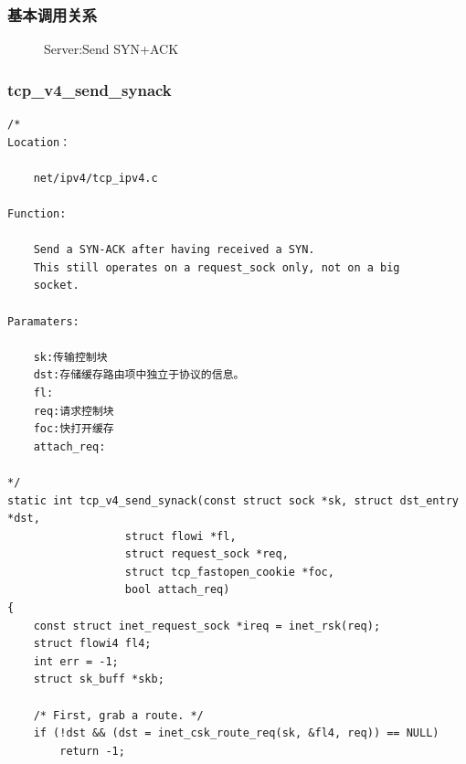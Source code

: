             \subsubsection{基本调用关系}            
                \begin{figure}[htb]        
                    \caption{Server:Send SYN+ACK}
                    \label{Server:Send SYN+ACK}
                \end{figure}   
            \subsubsection{tcp\_v4\_send\_synack}
                \label{ServerSendSYN+ACK:tcp_v4_send_synack}
\begin{verbatim}
/*
Location：

    net/ipv4/tcp_ipv4.c

Function: 

    Send a SYN-ACK after having received a SYN.
    This still operates on a request_sock only, not on a big
    socket.

Paramaters:

    sk:传输控制块
    dst:存储缓存路由项中独立于协议的信息。
    fl:
    req:请求控制块
    foc:快打开缓存
    attach_req:

*/
static int tcp_v4_send_synack(const struct sock *sk, struct dst_entry *dst,
                  struct flowi *fl,
                  struct request_sock *req,
                  struct tcp_fastopen_cookie *foc,
                  bool attach_req)
{
    const struct inet_request_sock *ireq = inet_rsk(req);
    struct flowi4 fl4;
    int err = -1;
    struct sk_buff *skb;

    /* First, grab a route. */
    if (!dst && (dst = inet_csk_route_req(sk, &fl4, req)) == NULL)
        return -1;
\end{verbatim}

